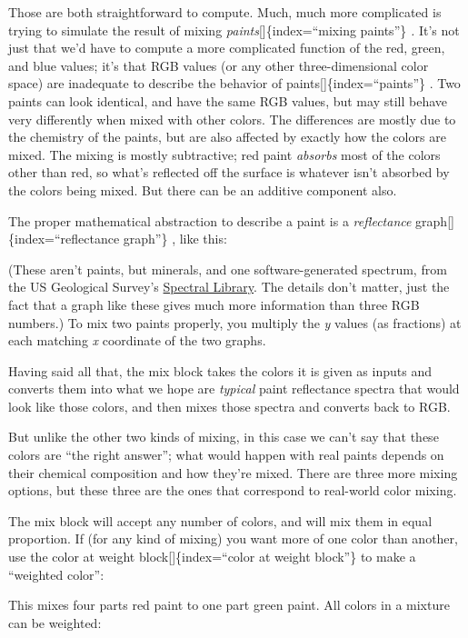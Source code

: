 \documentclass[
  letterpaper,
]{book}
\begin{document}
Those are both straightforward to compute. Much, much more complicated
is trying to simulate the result of mixing
\emph{paints}{[}{]}\{index=``mixing paints''\} \emph{.} It's not just
that we'd have to compute a more complicated function of the red, green,
and blue values; it's that RGB values (or any other three-dimensional
color space) are inadequate to describe the behavior of
paints{[}{]}\{index=``paints''\} . Two paints can look identical, and
have the same RGB values, but may still behave very differently when
mixed with other colors. The differences are mostly due to the chemistry
of the paints, but are also affected by exactly how the colors are
mixed. The mixing is mostly subtractive; red paint \emph{absorbs} most
of the colors other than red, so what's reflected off the surface is
whatever isn't absorbed by the colors being mixed. But there can be an
additive component also.

The proper mathematical abstraction to describe a paint is a
\emph{reflectance} graph{[}{]}\{index=``reflectance graph''\} , like
this:

(These aren't paints, but minerals, and one software-generated spectrum,
from the US Geological Survey's
\href{https://www.usgs.gov/labs/spec-lab/capabilities/spectral-library}{Spectral
Library}. The details don't matter, just the fact that a graph like
these gives much more information than three RGB numbers.) To mix two
paints properly, you multiply the \emph{y} values (as fractions) at each
matching \emph{x} coordinate of the two graphs.

Having said all that, the mix block takes the colors it is given as
inputs and converts them into what we hope are \emph{typical} paint
reflectance spectra that would look like those colors, and then mixes
those spectra and converts back to RGB.

But unlike the other two kinds of mixing, in this case we can't say that
these colors are ``the right answer''; what would happen with real
paints depends on their chemical composition and how they're mixed.
There are three more mixing options, but these three are the ones that
correspond to real-world color mixing.

The mix block will accept any number of colors, and will mix them in
equal proportion. If (for any kind of mixing) you want more of one color
than another, use the color at weight block{[}{]}\{index=``color at
weight block''\} to make a ``weighted color'':

This mixes four parts red paint to one part green paint. All colors in a
mixture can be weighted:
\end{document}
